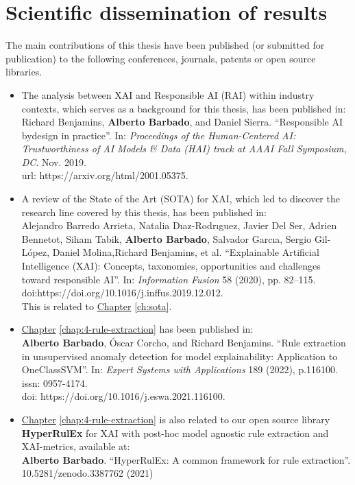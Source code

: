 \section{Scientific dissemination of results}\label{sec:ch2-dissemination-results}
The main contributions of this thesis have been published (or submitted for publication) to the following conferences, journals, patents or open source libraries.

\begin{itemize}
\item The analysis between XAI and Responsible AI (RAI) within industry contexts, which serves as a background for this thesis, has been published in:\\ Richard Benjamins, \textbf{Alberto Barbado}, and Daniel Sierra. “Responsible AI bydesign in practice”. In: \textit{Proceedings of the Human-Centered AI: Trustworthiness of AI Models \& Data (HAI) track at AAAI Fall Symposium, DC}. Nov. 2019. \\url: https://arxiv.org/html/2001.05375.

\item A review of the State of the Art (SOTA) for XAI, which led to discover the research line covered by this thesis, has been published in:\\ Alejandro Barredo Arrieta, Natalia Dıaz-Rodrıguez, Javier Del Ser, Adrien Bennetot, Siham Tabik, \textbf{Alberto Barbado}, Salvador Garcıa, Sergio Gil-López, Daniel Molina,Richard Benjamins, et al. “Explainable Artificial Intelligence (XAI): Concepts, taxonomies, opportunities and challenges toward responsible AI”. In: \textit{Information Fusion} 58 (2020), pp. 82–115. doi:https://doi.org/10.1016/j.inffus.2019.12.012. 
\\ This is related to \hyperref[ch:sota]{Chapter} \ref{ch:sota}.

\item \hyperref[chap:4-rule-extraction]{Chapter} \ref{chap:4-rule-extraction} has been published in: \\\textbf{Alberto Barbado}, Óscar Corcho, and Richard Benjamins. “Rule extraction in unsupervised anomaly detection for model explainability: Application to OneClassSVM”. In: \textit{Expert Systems with Applications} 189 (2022), p.116100. issn: 0957-4174. \\doi: https://doi.org/10.1016/j.eswa.2021.116100.
\item \hyperref[chap:4-rule-extraction]{Chapter} \ref{chap:4-rule-extraction} is also related to our open source library \textbf{HyperRulEx} for XAI with post-hoc model agnostic rule extraction and XAI-metrics, available at:
\\\textbf{Alberto Barbado}. “HyperRulEx: A common framework for rule extraction”. \\10.5281/zenodo.3387762 (2021)


\end{itemize}
